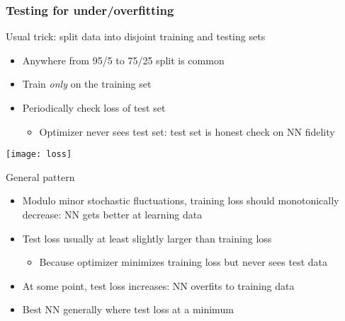 \begin{frame}
    \frametitle{Testing for under/overfitting}

    Usual trick: split data into disjoint \alert{training} and \alert{testing} sets
    \begin{itemize}
        \item Anywhere from 95/5 to 75/25 split is common
        \item Train \emph{only} on the training set
        \item Periodically check loss of test set
        \begin{itemize}
            \item Optimizer never sees test set: test set is honest check on NN fidelity
        \end{itemize}
    \end{itemize}
    \pause

    \texttt{[image: loss]}

    General pattern
    \begin{itemize}
        \item Modulo minor stochastic fluctuations, training loss should monotonically decrease: NN gets better at learning data
        \item Test loss usually at least slightly larger than training loss
        \begin{itemize}
            \item Because optimizer minimizes training loss but never sees test data
        \end{itemize}
        \item At some point, test loss increases: NN overfits to training data
        \item Best NN generally \textcolor{Green4}{where test loss at a minimum}
    \end{itemize}
\end{frame}


